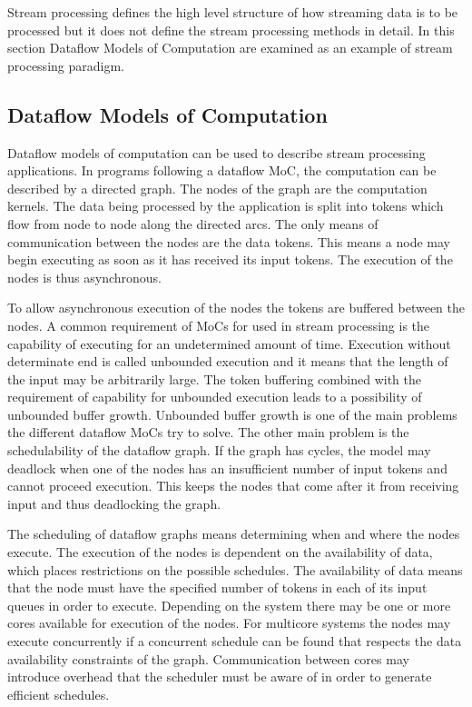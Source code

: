 
Stream processing defines the high level structure of how streaming data is to be processed but it does not define the stream processing methods in detail. In this section Dataflow Models of Computation are examined as an example of stream processing paradigm.

\subsection{Dataflow Models of Computation}
\label{subsec:dataflow-moc}
Dataflow models of computation can be used to describe stream processing applications. In programs following a dataflow MoC, the computation can be described by a directed graph. The nodes of the graph are the computation kernels. The data being processed by the application is split into tokens which flow from node to node along the directed arcs. The only means of communication between the nodes are the data tokens. This means a node may begin executing as soon as it has received its input tokens. The execution of the nodes is thus asynchronous.~\cite{lee2015introduction}

To allow asynchronous execution of the nodes the tokens are buffered between the nodes. A common requirement of MoCs for used in stream processing is the capability of executing for an undetermined amount of time. Execution without determinate end is called unbounded execution and it means that the length of the input may be arbitrarily large. The token buffering combined with the requirement of capability for unbounded execution leads to a possibility of unbounded buffer growth. Unbounded buffer growth is one of the main problems the different dataflow MoCs try to solve. The other main problem is the schedulability of the dataflow graph. If the graph has cycles, the model may deadlock when one of the nodes has an insufficient number of input tokens and cannot proceed execution. This keeps the nodes that come after it from receiving input and thus deadlocking the graph.~\cite{lee2015introduction}

The scheduling of dataflow graphs means determining when and where the nodes execute. The execution of the nodes is dependent on the availability of data, which places restrictions on the possible schedules. The availability of data means that the node must have the specified number of tokens in each of its input queues in order to execute. Depending on the system there may be one or more cores available for execution of the nodes. For multicore systems the nodes may execute concurrently if a concurrent schedule can be found that respects the data availability constraints of the graph. Communication between cores may introduce overhead that the scheduler must be aware of in order to generate efficient schedules.~\cite{lee1987synchronous}

